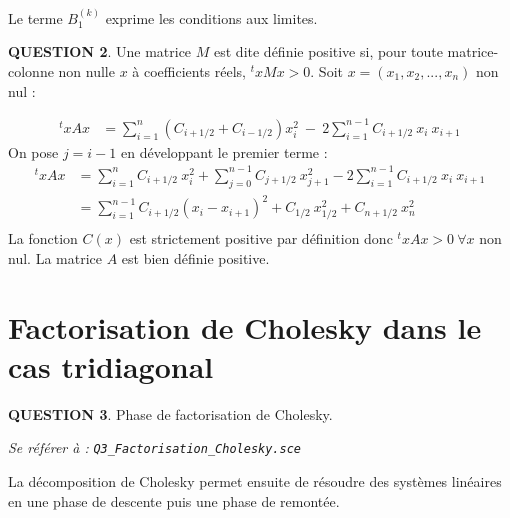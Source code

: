 \documentclass[a4paper,11pt]{article}
\newcommand{\quest}[1]{\small\textbf{#1}\normalsize}
\theoremstyle{nonumberplain}
\theoremstyle{nonumberplain}
\begin{document}
    \medskip
    Le terme $B_{1}^{(k)}$ exprime les conditions aux limites.

    \newpage
    \quest{QUESTION 2}. Une matrice $M$ est dite définie positive si, pour toute matrice-colonne non nulle $x$ à coefficients réels, $^txMx > 0$.
    Soit $x = (x_1, x_2, ... , x_n)$ non nul :

    \begin{calculs}
      \begin{equation*}
      \begin{split}
          ^txAx   & = \sum\limits_{i = 1}^{n} (C_{i+1/2} + C_{i-1/2}) x_i^2\ -\ 2 \sum\limits_{i = 1}^{n-1}C_{i+1/2}\ x_i\ x_{i+1}
      \end{split}
      \end{equation*}
      {\normalfont On pose} $j = i - 1$ {\normalfont en développant le premier terme :}
      \begin{equation}
      \begin{split}
          ^txAx   & = \sum\limits_{i = 1}^{n} C_{i+1/2}\ x_i^2 + \sum\limits_{j = 0}^{n-1} C_{j+1/2}\ x_{j+1}^2  - 2 \sum\limits_{i = 1}^{n-1} C_{i+1/2}\ x_i\ x_{i+1} \\
                  & = \sum\limits_{i = 1}^{n-1} C_{i+1/2} (x_i - x_{i+1})^2 + C_{1/2}\ x_{1/2}^2 + C_{n + 1/2}\ x_{n}^2 \\
      \end{split}
      \end{equation}
      {\normalfont La fonction} $C(x)$ {\normalfont est strictement positive par définition donc}
      $^txAx > 0\ \forall x$ {\normalfont non nul}.\newline
      {\normalfont La matrice $A$ est bien définie positive.}
    \end{calculs}

\smallskip
\section{Factorisation de Cholesky dans le cas tridiagonal}

    \quest{QUESTION 3}. Phase de factorisation de Cholesky.
    \begin{ref_scilab}
        \emph{Se référer à :} \texttt{\emph{Q3\_Factorisation\_Cholesky.sce}}
    \end{ref_scilab}
    La décomposition de Cholesky permet ensuite de résoudre des systèmes
    linéaires en une phase de descente puis une phase de remontée.
\end{document}

